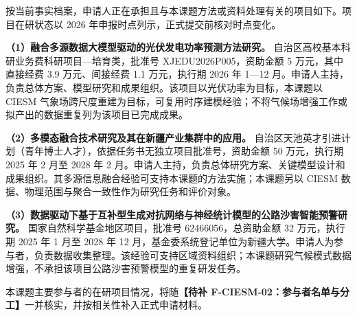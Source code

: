 \justifying
\NSFCBodyText

按当前事实档案，申请人正在承担且与本课题方法或资料处理有关的项目如下。项目在研状态以 2026 年申报时点列示，正式提交前核对时点变化。

\textbf{（1）融合多源数据大模型驱动的光伏发电功率预测方法研究。}
自治区高校基本科研业务费科研项目—培育类，批准号 XJEDU2026P005，资助金额 5 万元，其中直接经费 3.9 万元、间接经费 1.1 万元，执行期 2026 年 1—12 月。申请人主持，负责总体方案、模型研究和成果组织。该项目以光伏功率为目标，本课题以 CIESM 气象场跨尺度重建为目标，可复用时序建模经验；不将气候场增强工作或拟产出的数据重复列为该项目已完成成果。

\textbf{（2）多模态融合技术研究及其在新疆产业集群中的应用。}
自治区天池英才引进计划（青年博士人才），依据任务书无独立项目批准号，资助金额 50 万元，执行期 2025 年 2 月至 2028 年 2 月。申请人主持，负责总体研究方案、关键模型设计和成果组织。其多源信息融合经验可支持本课题的方法实施；本课题另以 CIESM 数据、物理范围与聚合一致性作为研究任务和评价对象。

\textbf{（3）数据驱动下基于互补型生成对抗网络与神经统计模型的公路沙害智能预警研究。}
国家自然科学基金地区项目，批准号 62466056，总资助金额 32 万元，执行期 2025 年 1 月至 2028 年 12 月，基金委系统登记单位为新疆大学。申请人为参与者，负责数据收集整理。该经验可支持区域资料组织；本课题研究气候模式数据增强，不承担该项目公路沙害预警模型的重复研发任务。

本课题主要参与者的在研项目情况，将随\textbf{【待补 F-CIESM-02：参与者名单与分工】}一并核实，并按相关性补入正式申请材料。
